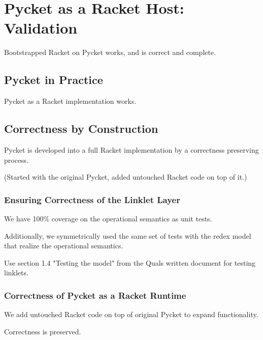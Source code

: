 \chapter{Pycket as a Racket Host: Validation}

	\begin{chapterpoint}
		Bootstrapped Racket on Pycket works, and is correct and complete.
	\end{chapterpoint}

	\section{Pycket in Practice}

		\begin{mainpoint}
			Pycket as a Racket implementation works.
		\end{mainpoint}

	\section{Correctness by Construction}

		\begin{mainpoint}
			Pycket is developed into a full Racket implementation by a correctness preserving process.

			(Started with the original Pycket, added untouched Racket code on top of it.)
		\end{mainpoint}

		\subsection{Ensuring Correctness of the Linklet Layer}
			\begin{mainpoint}
				We have 100\% coverage on the operational semantics as unit tests.

				Additionally, we symmetrically used the same set of tests with the redex model that realize the operational semantics.
			\end{mainpoint}

			\begin{todo}[Import]
				Use section 1.4 "Testing the model" from the Quals written document for testing linklets.
			\end{todo}

		\subsection{Correctness of Pycket as a Racket Runtime}
			\begin{mainpoint}
				We add untouched Racket code on top of original Pycket to expand functionality.

				Correctness is preserved.
			\end{mainpoint}

